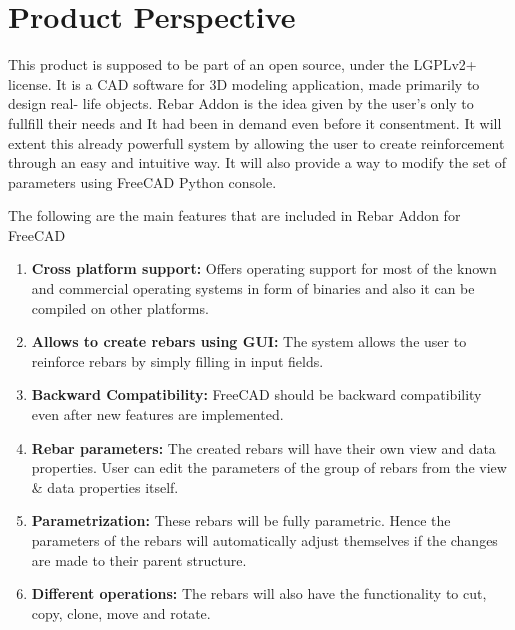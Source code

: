 \section{Product Perspective}
   
This product is supposed to be part of an open source, under the LGPLv2+ license. It is a CAD software for 3D modeling application, made primarily to design real-
life objects. Rebar Addon is the idea given by the user's only to fullfill their needs and It had been in demand even before it consentment. It will extent this already powerfull system by allowing the user to create reinforcement through an easy and intuitive way. It will also provide a way to modify the set of parameters using FreeCAD Python console.
   
The following are the main features that are included in Rebar Addon for FreeCAD

\begin{enumerate}
    \item \textbf{Cross platform support:} Offers operating support for most of the known and commercial operating systems in form of binaries and also it can be compiled on other platforms.
   
    \item \textbf{Allows to create rebars using GUI:} The system allows the user to reinforce rebars by simply filling in input fields.
   
    \item \textbf{Backward Compatibility:} FreeCAD should be backward compatibility even after new features are implemented.
   
    \item \textbf{Rebar parameters:} The created rebars will have their own view and data properties. User can edit the parameters of the group of rebars from the view \& data properties itself.
   
   
    \item \textbf{Parametrization:} These rebars will be fully parametric. Hence the parameters of the rebars will automatically adjust themselves if the changes are made to their parent structure.
    
    \item \textbf{Different operations:} The rebars will also have the functionality to cut, copy, clone, move and rotate.
   
\end{enumerate}  

